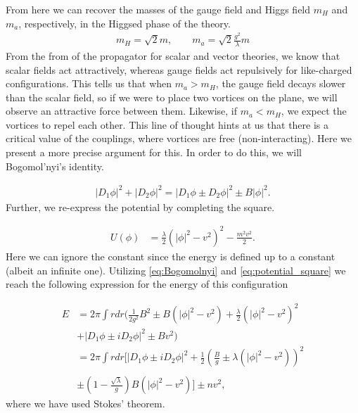     From here we can recover the masses of the gauge field and Higgs field $m_{H}$ and $m_a$, respectively, in the Higgsed phase of the theory.
    \begin{align}
        m_{H}= \sqrt{2} m, \qquad m_a = \sqrt{2} \frac{g^2}{\lambda}m
    \end{align}
    From the from of the propagator for scalar and vector theories, we know that scalar fields act attractively, whereas gauge fields act repulsively for like-charged configurations. This tells us that when $m_a>m_H$, the gauge field decays slower than the scalar field, so if we were to place two vortices on the plane, we will observe an attractive force between them. Likewise, if  $m_a<m_H$, we expect the vortices to repel each other. This line of thought hints at us that there is a critical value of the couplings, where vortices are free (non-interacting). Here we present a more precise argument for this. In order to do this, we will Bogomol'nyi's identity.

    \begin{align}
        |D_1 \phi|^2 + |D_2 \phi|^2 = |D_1 \phi \pm D_2 \phi|^2 \pm B |\phi|^2. \label{eq:Bogomolnyi}
    \end{align}
    Further, we re-express the potential by completing the square.

    \begin{align}
        U(\phi)&=\frac{\lambda}{2} \left( |\phi|^2 - v^2 \right)^2 - \frac{m^2 v^2}{2}. \label{eq:potential_square}
    \end{align}
    Here we can ignore the constant since the energy is defined up to a constant (albeit an infinite one). Utilizing \eqref{eq:Bogomolnyi} and \eqref{eq:potential_square} we reach the following expression for the energy of this configuration

    \begin{align}
        E &= 2 \pi \int r dr \bigg(\frac{1}{2 g^2}B^2 \pm B(|\phi|^2 -v^2) + \frac{\lambda}{2} \left(|\phi|^2 -v^2 \right)^2 \\ \nonumber 
        &+ |D_1\phi \pm i D_2 \phi|^2 \pm B v^2 \bigg) \\ \nonumber
        &= 2 \pi \int r dr \bigg[|D_1\phi \pm i D_2 \phi|^2 +\frac{1}{2}\left( \frac{B}{g} \pm \lambda \left(|\phi|^2 -v^2  \right) \right)^2   \\ \nonumber \\
        &\pm \left(1 - \frac{\sqrt{\lambda}}{g} \right) B \left(|\phi|^2 - v^2 \right) \bigg] \pm n v^2,
    \end{align}
    where we have used Stokes' theorem.

